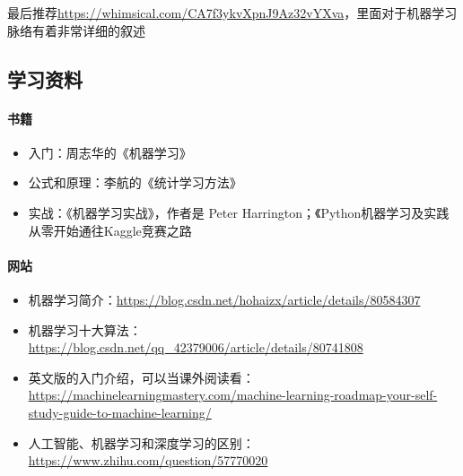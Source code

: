 \documentclass[lang=cn,11pt,a4paper]{elegant_template}
\begin{document}
最后推荐\href{https://whimsical.com/CA7f3ykvXpnJ9Az32vYXva}{https://whimsical.com/CA7f3ykvXpnJ9Az32vYXva}，里面对于机器学习脉络有着非常详细的叙述

\subsection{学习资料}
\paragraph{书籍}
\begin{itemize}
    \item 入门：周志华的《机器学习》
    \item 公式和原理：李航的《统计学习方法》
    \item 实战：《机器学习实战》，作者是 Peter Harrington；《Python机器学习及实践 从零开始通往Kaggle竞赛之路
\end{itemize}

\paragraph{网站}
\begin{itemize}
    \item 机器学习简介：\href{https://blog.csdn.net/hohaizx/article/details/80584307}{https://blog.csdn.net/hohaizx/article/details/80584307}
    \item 机器学习十大算法：\href{https://blog.csdn.net/qq_42379006/article/details/80741808}{https://blog.csdn.net/qq\_42379006/article/details/80741808}
    \item 英文版的入门介绍，可以当课外阅读看：\href{https://machinelearningmastery.com/machine-learning-roadmap-your-self-study-guide-to-machine-learning/}{https://machinelearningmastery.com/machine-learning-roadmap-your-self-study-guide-to-machine-learning/}
    \item 人工智能、机器学习和深度学习的区别：\href{https://www.zhihu.com/question/57770020}{https://www.zhihu.com/question/57770020}
\end{itemize}
\end{document}
